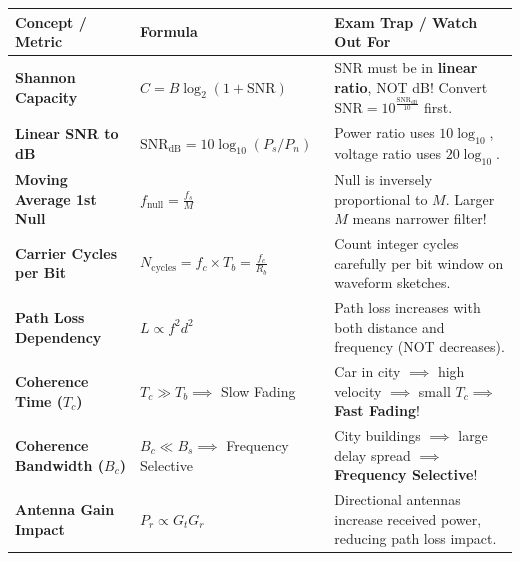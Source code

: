 \documentclass[10pt,a4paper]{article}
\begin{document}
\begin{center}
\small
\begin{tabular}{p{4.2cm} p{5.5cm} p{6.2cm}}
\toprule
\rowcolor{lightbg}
\textbf{Concept / Metric} & \textbf{Formula} & \textbf{Exam Trap / Watch Out For} \\
\midrule
\textbf{Shannon Capacity} & $C = B \log_2(1 + \text{SNR})$ & SNR must be in \textbf{linear ratio}, NOT dB! Convert $\text{SNR} = 10^{\frac{\text{SNR}_{\text{dB}}}{10}}$ first. \\
\textbf{Linear SNR to dB} & $\text{SNR}_{\text{dB}} = 10 \log_{10}(P_s / P_n)$ & Power ratio uses $10\log_{10}$, voltage ratio uses $20\log_{10}$. \\
\textbf{Moving Average 1st Null} & $f_{\text{null}} = \frac{f_s}{M}$ & Null is inversely proportional to $M$. Larger $M$ means narrower filter! \\
\textbf{Carrier Cycles per Bit} & $N_{\text{cycles}} = f_c \times T_b = \frac{f_c}{R_b}$ & Count integer cycles carefully per bit window on waveform sketches. \\
\textbf{Path Loss Dependency} & $L \propto f^2 d^2$ & Path loss increases with both distance and frequency (NOT decreases). \\
\textbf{Coherence Time ($T_c$)} & $T_c \gg T_b \implies$ Slow Fading & Car in city $\implies$ high velocity $\implies$ small $T_c \implies$ \textbf{Fast Fading}! \\
\textbf{Coherence Bandwidth ($B_c$)} & $B_c \ll B_s \implies$ Frequency Selective & City buildings $\implies$ large delay spread $\implies$ \textbf{Frequency Selective}! \\
\textbf{Antenna Gain Impact} & $P_r \propto G_t G_r$ & Directional antennas increase received power, reducing path loss impact. \\
\bottomrule
\end{tabular}
\end{center}
\end{document}

